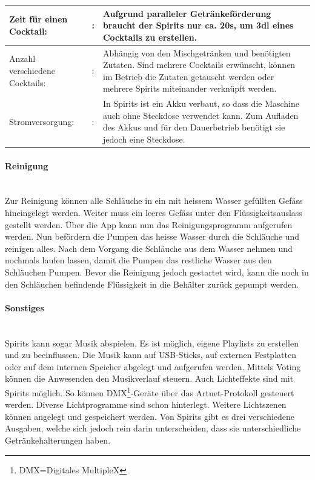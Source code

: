 \begin{tabular}{@{}llp{}}
    Zeit für einen Cocktail: & : & Aufgrund paralleler Getränkeförderung braucht der Spirits nur ca. 20s, um 3dl eines Cocktails zu erstellen. \cite{koths_spirits_nodate}\\
    \hline
    Anzahl verschiedene Cocktails: & : & Abhängig von den Mischgetränken und benötigten Zutaten. Sind mehrere Cocktails erwünscht, können im Betrieb die Zutaten getauscht werden oder mehrere Spirits miteinander verknüpft werden. \cite{koths_spirits_nodate}\\ 
    \hline
    Stromversorgung: & : & In Spirits ist ein Akku verbaut, so dass die Maschine auch ohne Steckdose verwendet kann. Zum Aufladen des Akkus und für den Dauerbetrieb benötigt sie jedoch eine Steckdose. \cite{koths_spirits_nodate}\\
\end{tabular}

\paragraph{Reinigung}\label{subsubsec:Reinigung_Spirits}\mbox{}\\

Zur Reinigung können alle Schläuche in ein mit heissem Wasser gefüllten Gefäss hineingelegt werden. Weiter muss ein leeres Gefäss unter den Flüssigkeitsauslass gestellt werden. Über die App kann nun das Reinigungsprogramm aufgerufen werden. Nun befördern die Pumpen das heisse Wasser durch die Schläuche und reinigen alles. Nach dem Vorgang die Schläuche aus dem Wasser nehmen und nochmals laufen lassen, damit die Pumpen das restliche Wasser aus den Schläuchen Pumpen.
Bevor die Reinigung jedoch gestartet wird, kann die noch in den Schläuchen befindende Flüssigkeit in die Behälter zurück gepumpt werden.\cite{koths_spirits_nodate}

\paragraph{Sonstiges}\label{subsubsec:Sonstiges_Spirits}\mbox{}\\

Spirits kann sogar Musik abspielen. Es ist möglich, eigene Playlists zu erstellen und zu beeinflussen. Die Musik kann auf USB-Sticks, auf externen Festplatten oder auf dem internen Speicher abgelegt und aufgerufen werden. Mittels Voting können die Anwesenden den Musikverlauf steuern. Auch Lichteffekte sind mit Spirits möglich. So können DMX\footnote{DMX=Digitales MultipleX}-Geräte über das Artnet-Protokoll gesteuert werden. Diverse Lichtprogramme sind schon hinterlegt. Weitere Lichtszenen können angelegt und gespeichert werden. Von Spirits gibt es drei verschiedene Ausgaben, welche sich jedoch rein darin unterscheiden, dass sie unterschiedliche Getränkehalterungen haben.\cite{koths_spirits_nodate}

